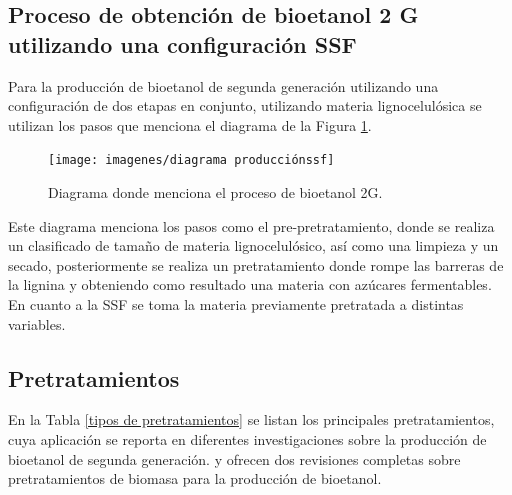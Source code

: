 \documentclass[12pt]{article}
\begin{document}
		\subsection{Proceso de obtención de bioetanol 2 G  utilizando una configuración SSF  }		
		Para la producción de bioetanol de segunda generación utilizando una configuración de dos etapas en conjunto, utilizando materia lignocelulósica se utilizan los pasos que menciona el diagrama de la Figura \ref{fig:diagrama-produccionssf}.
	
		\begin{figure}[H]
			\centering
			\texttt{[image: imagenes/diagrama producciónssf]}
			\caption{Diagrama donde menciona el proceso de bioetanol 2G.}
			\label{fig:diagrama-produccionssf}
		\end{figure}
		
		
	Este diagrama menciona los pasos como el pre-pretratamiento, donde se realiza un clasificado de tamaño de materia lignocelulósico, así como una limpieza y un secado, posteriormente se realiza un pretratamiento donde rompe las barreras de la lignina y obteniendo como resultado una materia con azúcares fermentables. En cuanto a la SSF se toma la materia previamente pretratada a distintas variables.
		
		
		
		\subsection{Pretratamientos}
		En la Tabla \ref{tipos de pretratamientos} se listan los principales pretratamientos, cuya aplicación se reporta en diferentes investigaciones sobre la producción de bioetanol de segunda generación. \cite{ADITIYA2016631} y \cite{Nasution_2022}
		ofrecen dos revisiones completas sobre pretratamientos de biomasa para la producción de bioetanol.
		
\end{document}
